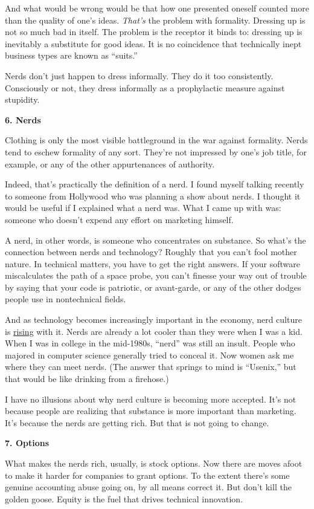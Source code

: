And what would be wrong would be that how one presented oneself counted
more than the quality of one's ideas. \emph{That's} the problem with
formality. Dressing up is not so much bad in itself. The problem is the
receptor it binds to: dressing up is inevitably a substitute for good
ideas. It is no coincidence that technically inept business types are
known as ``suits.''

Nerds don't just happen to dress informally. They do it too
consistently. Consciously or not, they dress informally as a
prophylactic measure against stupidity.

\textbf{6. Nerds}

Clothing is only the most visible battleground in the war against
formality. Nerds tend to eschew formality of any sort. They're not
impressed by one's job title, for example, or any of the other
appurtenances of authority.

Indeed, that's practically the definition of a nerd. I found myself
talking recently to someone from Hollywood who was planning a show about
nerds. I thought it would be useful if I explained what a nerd was. What
I came up with was: someone who doesn't expend any effort on marketing
himself.

A nerd, in other words, is someone who concentrates on substance. So
what's the connection between nerds and technology? Roughly that you
can't fool mother nature. In technical matters, you have to get the
right answers. If your software miscalculates the path of a space probe,
you can't finesse your way out of trouble by saying that your code is
patriotic, or avant-garde, or any of the other dodges people use in
nontechnical fields.

And as technology becomes increasingly important in the economy, nerd
culture is \href{nerdad.html}{rising} with it. Nerds are already a lot
cooler than they were when I was a kid. When I was in college in the
mid-1980s, ``nerd'' was still an insult. People who majored in computer
science generally tried to conceal it. Now women ask me where they can
meet nerds. (The answer that springs to mind is ``Usenix,'' but that
would be like drinking from a firehose.)

I have no illusions about why nerd culture is becoming more accepted.
It's not because people are realizing that substance is more important
than marketing. It's because the nerds are getting rich. But that is not
going to change.

\textbf{7. Options}

What makes the nerds rich, usually, is stock options. Now there are
moves afoot to make it harder for companies to grant options. To the
extent there's some genuine accounting abuse going on, by all means
correct it. But don't kill the golden goose. Equity is the fuel that
drives technical innovation.

